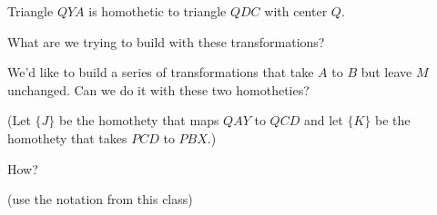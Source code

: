 




Triangle $QYA$ is homothetic to triangle $QDC$ with center $Q.$

What are we trying to build with these transformations?

We'd like to build a series of transformations that take $A$ to $B$ but leave $M$ unchanged.  Can we do it with these two homotheties?

(Let $\{J\}$ be the homothety that maps $QAY$ to $QCD$ and let $\{K\}$ be the homothety that takes $PCD$ to $PBX.$)


How?

(use the notation from this class)








